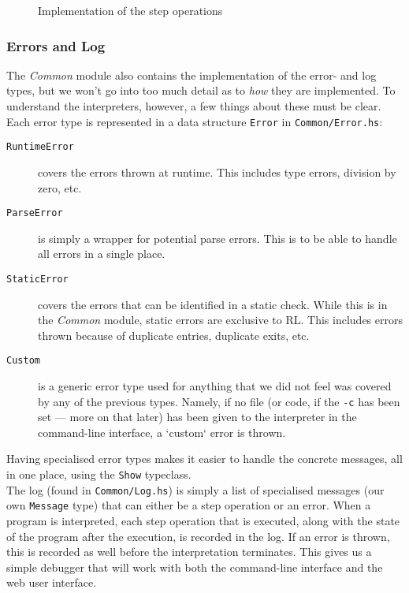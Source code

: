 \begin{figure}[H]
  
  \caption{Implementation of the step operations}\label{fig:step}
\end{figure}

\subsubsection{Errors and Log}
The \textit{Common} module also contains the implementation of the error- and log types, but we won't go into too much detail as to \textit{how} they are implemented. To understand the interpreters, however, a few things about these must be clear.\\

\noindent Each error type is represented in a data structure \texttt{Error} in \texttt{Common/Error.hs}:
\begin{description}
  \item[\texttt{RuntimeError}] covers the errors thrown at runtime. This includes type errors, division by zero, etc.
  \item[\texttt{ParseError}] is simply a wrapper for potential parse errors. This is to be able to handle all errors in a single place.
  \item[\texttt{StaticError}] covers the errors that can be identified in a static check. While this is in the \textit{Common} module, static errors are exclusive to RL. This includes errors thrown because of duplicate entries, duplicate exits, etc.
  \item[\texttt{Custom}] is a generic error type used for anything that we did not feel was covered by any of the previous types. Namely, if no file (or code, if the \texttt{-c} has been set --- more on that later) has been given to the interpreter in the command-line interface, a `custom` error is thrown.
\end{description}

\noindent Having specialised error types makes it easier to handle the concrete messages, all in one place, using the \texttt{Show} typeclass.\\

\noindent The log (found in \texttt{Common/Log.hs}) is simply a list of specialised messages (our own \texttt{Message} type) that can either be a step operation or an error. When a program is interpreted, each step operation that is executed, along with the state of the program after the execution, is recorded in the log. If an error is thrown, this is recorded as well before the interpretation terminates. This gives us a simple debugger that will work with both the command-line interface and the web user interface.

